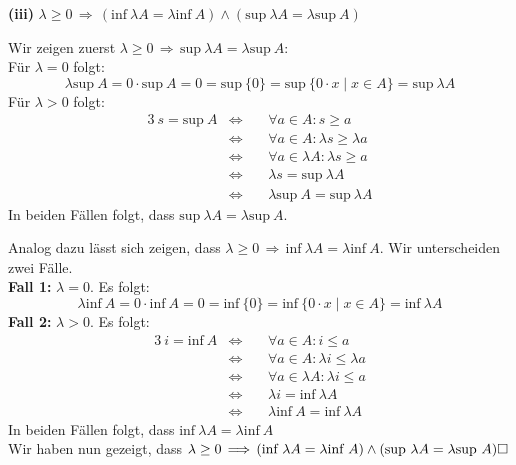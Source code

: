 \documentclass[a4paper,graphics,11pt]{article}
\begin{document}
\textbf{(iii)} $\lambda \geq 0 \,\Longrightarrow\, (\text{inf}\ \lambda A = \lambda \text{inf}\ A)
\land (\text{sup}\ \lambda A = \lambda \text{sup}\ A)$

Wir zeigen zuerst $\lambda \geq 0 \,\Longrightarrow\, \text{sup}\ \lambda A = \lambda \text{sup}\ A$:\\
Für $\lambda = 0$ folgt:
$$
    \lambda \text{sup}\ A = 0 \cdot \text{sup}\ A = 0 = \text{sup}\ \{0\}
    = \text{sup}\ \{0\cdot x \mid x \in A\} = \text{sup}\ \lambda A
$$
Für $\lambda > 0$ folgt:
\begin{alignat*}{3}
    \ s = \text{sup}\ A&\Longleftrightarrow\,&& \forall a \in A \colon s \geq a\\[1pt]
    &\Longleftrightarrow\ && \forall a \in A \colon \lambda s\geq \lambda a\\[1pt]
    &\Longleftrightarrow&& \forall a \in \lambda A \colon \lambda s\geq a\\[1pt]
    &\Longleftrightarrow&& \lambda s = \text{sup}\ \lambda A\\[1pt]
    &\Longleftrightarrow&& \lambda \text{sup}\ A = \text{sup}\ \lambda A
\end{alignat*}
In beiden Fällen folgt, dass $\text{sup}\ \lambda A = \lambda \text{sup}\ A$.

\newpage

Analog dazu lässt sich zeigen, dass $\lambda \geq 0 \,\Longrightarrow\,
\text{inf}\ \lambda A = \lambda \text{inf}\ A$.
Wir unterscheiden zwei Fälle.\\
\textbf{Fall 1:} $\lambda = 0$. Es folgt:
$$
    \lambda \text{inf}\ A = 0 \cdot \text{inf}\ A = 0 = \text{inf}\ \{0\}
    = \text{inf}\ \{0\cdot x \mid x \in A\} = \text{inf}\ \lambda A
$$
\textbf{Fall 2:} $\lambda > 0$. Es folgt:
\begin{alignat*}{3}
    \ i = \text{inf}\ A &\Longleftrightarrow&& \forall a \in A \colon i \leq a\\[1pt]
    &\Longleftrightarrow\ && \forall a \in A \colon \lambda i\leq \lambda a\\[1pt]
    &\Longleftrightarrow&& \forall a \in \lambda A \colon \lambda i\leq a\\[1pt]
    &\Longleftrightarrow&& \lambda i = \text{inf}\ \lambda A\\[1pt]
    &\Longleftrightarrow&& \lambda \text{inf}\ A = \text{inf}\ \lambda A
\end{alignat*}
In beiden Fällen folgt, dass $\text{inf}\ \lambda A = \lambda \text{inf}\ A$\\
Wir haben nun gezeigt, dass
$\lambda \geq 0 \,\Longrightarrow\, (\text{inf}\ \lambda A = \lambda \text{inf}\ A)
\land (\text{sup}\ \lambda A = \lambda \text{sup}\ A) \hfill \square$\\
\end{document}
